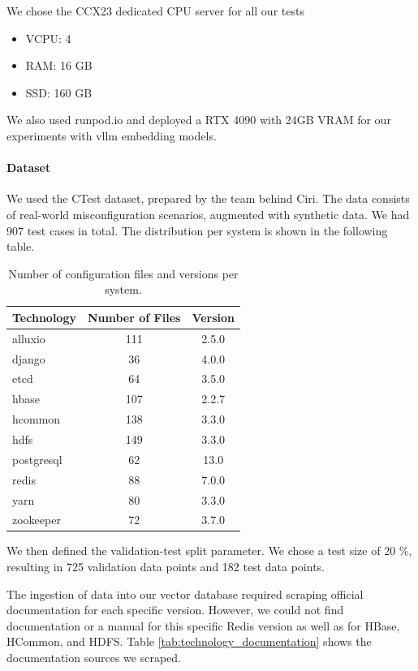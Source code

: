 We chose the CCX23 dedicated CPU server\cite{hetzner-online-gmbh-2025} for all our tests
\begin{itemize}
    \item VCPU: 4
    \item RAM: 16 GB
    \item SSD: 160 GB
\end{itemize}

We also used runpod.io\cite{runpod-2025} and deployed a RTX 4090 with 24GB VRAM for our experiments with vllm \cite{Kwon.12.09.2023} embedding models.

\paragraph{Dataset} 
We used the CTest dataset, prepared by the team behind Ciri\cite{Lian.2024}\cite{xlab-uiuc-2025}. The data consists of real-world misconfiguration scenarios, augmented with synthetic data. We had 907 test cases in total. The distribution per system is shown in the following table.

\begin{table}[h]
    \centering
    \begin{tabular}{|l|c|c|}
        \hline
        \textbf{Technology} & \textbf{Number of Files} & \textbf{Version} \\
        \hline
        alluxio & 111 & 2.5.0 \\
        django & 36 & 4.0.0 \\
        etcd & 64 & 3.5.0 \\
        hbase & 107 & 2.2.7 \\
        hcommon & 138 & 3.3.0 \\
        hdfs & 149 & 3.3.0 \\
        postgresql & 62 & 13.0 \\
        redis & 88 & 7.0.0 \\
        yarn & 80 & 3.3.0 \\
        zookeeper & 72 & 3.7.0 \\
        \hline
    \end{tabular}
    \caption{Number of configuration files and versions per system.}
    \label{tab:technology_values}
\end{table}

We then defined the validation-test split parameter. We chose a test size of 20 \%, resulting in 725 validation data points and 182 test data points.  

The ingestion of data into our vector database required scraping official documentation for each specific version. However, we could not find documentation or a manual for this specific Redis version as well as for HBase, HCommon, and HDFS. Table \ref{tab:technology_documentation} shows the documentation sources we scraped.

